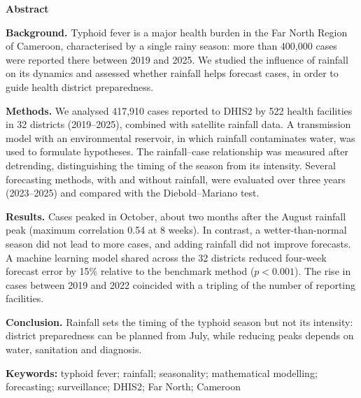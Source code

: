 \documentclass[11pt]{article}
\begin{document}
\begin{tcolorbox}[colback=white,colframe=black,boxrule=0.5pt,arc=0pt,left=8pt,right=8pt,top=6pt,bottom=6pt,fontupper=\small]
{\sffamily\bfseries\color{navy}Abstract}\par\vspace{3pt}
\textbf{Background.} Typhoid fever is a major health burden in the Far North Region of Cameroon, characterised by a single rainy season: more than 400,000 cases were reported there between 2019 and 2025. We studied the influence of rainfall on its dynamics and assessed whether rainfall helps forecast cases, in order to guide health district preparedness.\par
\textbf{Methods.} We analysed 417,910 cases reported to DHIS2 by 522 health facilities in 32 districts (2019–2025), combined with satellite rainfall data. A transmission model with an environmental reservoir, in which rainfall contaminates water, was used to formulate hypotheses. The rainfall–case relationship was measured after detrending, distinguishing the timing of the season from its intensity. Several forecasting methods, with and without rainfall, were evaluated over three years (2023–2025) and compared with the Diebold–Mariano test.\par
\textbf{Results.} Cases peaked in October, about two months after the August rainfall peak (maximum correlation 0.54 at 8 weeks). In contrast, a wetter-than-normal season did not lead to more cases, and adding rainfall did not improve forecasts. A machine learning model shared across the 32 districts reduced four-week forecast error by 15\% relative to the benchmark method ($p<0.001$). The rise in cases between 2019 and 2022 coincided with a tripling of the number of reporting facilities.\par
\textbf{Conclusion.} Rainfall sets the timing of the typhoid season but not its intensity: district preparedness can be planned from July, while reducing peaks depends on water, sanitation and diagnosis.\par\vspace{3pt}
\textbf{Keywords:} typhoid fever; rainfall; seasonality; mathematical modelling; forecasting; surveillance; DHIS2; Far North; Cameroon
\end{tcolorbox}
\end{document}
